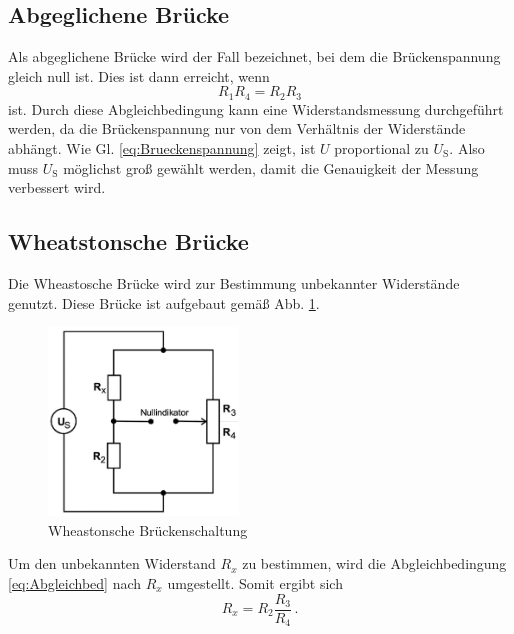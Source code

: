     \subsection{Abgeglichene Brücke}
    Als abgeglichene Brücke wird der Fall bezeichnet, bei dem die Brückenspannung gleich null ist.
    Dies ist dann erreicht, wenn
    \begin{equation}
        R_1 R_4 = R_2 R_3
        \label{eq:Abgleichbed}
    \end{equation}
    ist.
    Durch diese Abgleichbedingung kann eine Widerstandsmessung durchgeführt werden, da die Brückenspannung
    nur von dem Verhältnis der Widerstände abhängt.
    Wie Gl. \ref{eq:Brueckenspannung} zeigt, ist $U$ proportional zu $U_{\text{S}}$.
    Also muss $U_{\text{S}}$ möglichst groß gewählt werden, damit die Genauigkeit der Messung verbessert wird.
    \subsection{Wheatstonsche Brücke}
    Die Wheastosche Brücke wird zur Bestimmung unbekannter Widerstände genutzt.
    Diese Brücke ist aufgebaut gemäß Abb. \ref{fig:Wheastonsche_Bruecke}.
    \begin{figure}
        \centering
        \includegraphics[height= 5cm]{Messdaten/Wheastonsche-Brueke.pdf}
        \caption{Wheastonsche Brückenschaltung}
        \label{fig:Wheastonsche_Bruecke}
    \end{figure}
    Um den unbekannten Widerstand $R_x$ zu bestimmen, wird die Abgleichbedingung \eqref{eq:Abgleichbed} nach $R_x$ umgestellt.
    Somit ergibt sich
    \begin{equation*}
        R_x = R_2 \frac{R_3}{R_4} \, \text{.}
    \end{equation*}
